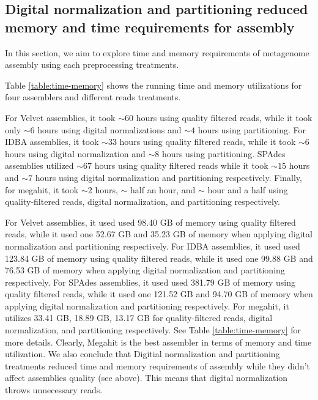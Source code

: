 \subsection*{Digital normalization and partitioning reduced memory and time requirements for assembly}
In this section, we aim to explore time and memory requirements of  metagenome assembly using each preprocessing treatments.  

Table \ref {table:time-memory}  shows the  running time and memory utilizations for four assemblers and different reads treatments.
 

For Velvet assemblies, it  took $\sim 60$ hours using quality filtered reads, while it took only  $\sim 6$ hours using digital normalizations and  $\sim 4$ hours using partitioning.  For IDBA assemblies, it took $\sim 33$ hours using quality filtered reads, while it took $\sim 6$ hours using digital normalization and $\sim 8$ hours using partitioning. SPAdes assemblies utilized $\sim 67$ hours using quality filtered reads  while it took $\sim15$ hours and $\sim 7$ hours using digital normalization and partitioning respectively. Finally, for megahit, it  took $\sim 2$ hours, $\sim$ half an hour, and $\sim$ hour and a half using quality-filtered reads, digital normalization, and partitioning respectively. 
 

For Velvet assemblies, it used used 98.40 GB of memory using quality filtered reads, while it used one 52.67 GB and  35.23 GB of memory when applying digital normalization and partitioning respectively. For IDBA assemblies, it used used 123.84 GB of memory using quality filtered reads, while it used one 99.88 GB and 76.53 GB of memory when applying digital normalization and partitioning respectively. For SPAdes assemblies, it used used 381.79 GB of memory using quality filtered reads, while it used one 121.52 GB and 94.70 GB of memory when applying digital normalization and partitioning respectively.  For megahit, it utilizes 33.41 GB, 18.89 GB,  13.17 GB for quality-filtered reads, digital normalization, and partitioning respectively. See Table \ref{table:time-memory} for more details. 
Clearly, Megahit is the best assembler in terms of memory and time utilization. We also conclude that Digitial normalization and partitioning treatments reduced time and memory requirements of assembly while they didn't affect assemblies quality (see above). This means that digital normalization throws unnecessary reads. 


